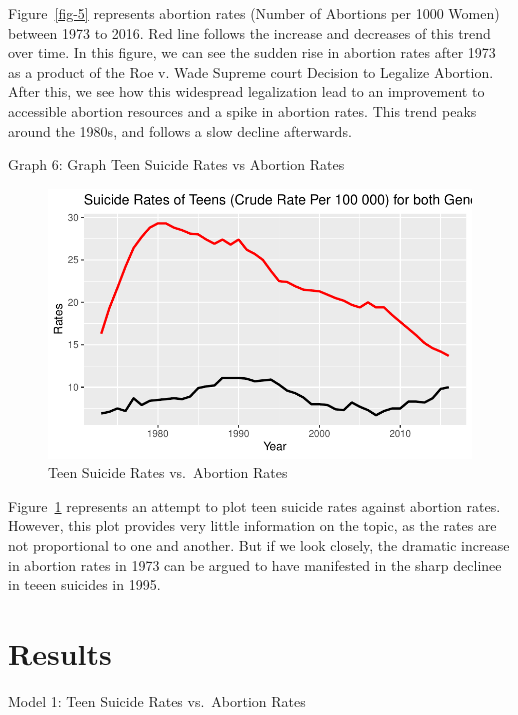 \documentclass[
  letterpaper,
  DIV=11,
  numbers=noendperiod]{scrartcl}
\begin{document}
Figure~\ref{fig-5} represents abortion rates (Number of Abortions per
1000 Women) between 1973 to 2016. Red line follows the increase and
decreases of this trend over time. In this figure, we can see the sudden
rise in abortion rates after 1973 as a product of the Roe v. Wade
Supreme court Decision to Legalize Abortion. After this, we see how this
widespread legalization lead to an improvement to accessible abortion
resources and a spike in abortion rates. This trend peaks around the
1980s, and follows a slow decline afterwards.

Graph 6: Graph Teen Suicide Rates vs Abortion Rates

\begin{figure}

{\centering \includegraphics{paper_files/figure-pdf/fig-6-1.pdf}

}

\caption{\label{fig-6}Teen Suicide Rates vs.~Abortion Rates}

\end{figure}

Figure~\ref{fig-6} represents an attempt to plot teen suicide rates
against abortion rates. However, this plot provides very little
information on the topic, as the rates are not proportional to one and
another. But if we look closely, the dramatic increase in abortion rates
in 1973 can be argued to have manifested in the sharp declinee in teeen
suicides in 1995.

\hypertarget{results}{%
\section{Results}\label{results}}

Model 1: Teen Suicide Rates vs.~Abortion Rates
\end{document}

